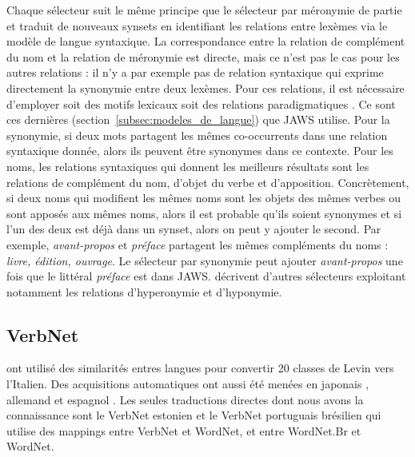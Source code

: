 Chaque sélecteur suit le même principe que le sélecteur par méronymie de partie
et traduit de nouveaux synsets en identifiant les relations entre lexèmes via
le modèle de langue syntaxique. La correspondance entre la relation de
complément du nom et la relation de méronymie est directe, mais ce n'est pas le
cas pour les autres relations : il n'y a par exemple pas de relation syntaxique
qui exprime directement la synonymie entre deux lexèmes. Pour ces relations, il
est nécessaire d'employer soit des motifs lexicaux \citep{hearst1992automatic}
soit des relations paradigmatiques \citep{lenci2012identifying}. Ce sont ces
dernières (section~\ref{subsec:modeles_de_langue}) que JAWS utilise. Pour la
synonymie, si deux mots partagent les mêmes co-occurrents dans une relation
syntaxique donnée, alors ils peuvent être synonymes dans ce contexte. Pour les
noms, les relations syntaxiques qui donnent les meilleurs résultats sont les
relations de complément du nom, d'objet du verbe et d'apposition. Concrètement,
si deux noms qui modifient les mêmes noms sont les objets des mêmes verbes ou
sont apposés aux mêmes noms, alors il est probable qu'ils soient synonymes et
si l'un des deux est déjà dans un synset, alors on peut y ajouter le second.
Par exemple, \textit{avant-propos} et \textit{préface} partagent les mêmes
compléments du noms : \textit{livre, édition, ouvrage}. Le sélecteur par
synonymie peut ajouter \textit{avant-propos} une fois que le littéral
\textit{préface} est dans JAWS. \citep{mouton2010jaws,mouton2010phd} décrivent
d'autres sélecteurs exploitant notamment les relations d'hyperonymie et
d'hyponymie.

\subsection{VerbNet}

\cite{merlo2002multilingual} ont utilisé des similarités entres langues pour
convertir 20 classes de Levin vers l'Italien. Des acquisitions automatiques ont
aussi été menées en japonais \citep{suzuki2009classifying}, allemand
\citep{im2006experiments} et espagnol \citep{ferrer2004towards}. Les seules
traductions directes dont nous avons la connaissance sont le VerbNet estonien
\citep{jentson2014verbnet} et le VerbNet portuguais brésilien
\citep{scarton2012towards} qui utilise des mappings entre VerbNet et WordNet,
et entre WordNet.Br et WordNet.

